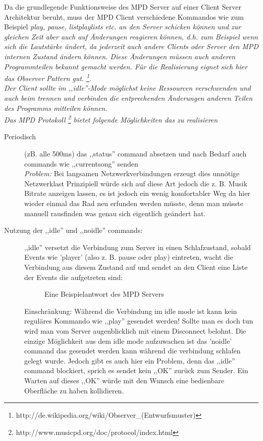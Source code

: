 Da die grundlegende Funktionsweise des MPD Server auf einer Client Server Architektur beruht, muss der MPD Client
verschiedene Kommandos wie zum Beispiel \it play, pause, listplaylists \rm etc. an den Server schicken können
und zur gleichen Zeit aber auch auf Änderungen reagieren können, d.h. zum Beispiel wenn sich die Lautstärke ändert,
da jederzeit auch andere Clients oder Server den MPD internen Zustand ändern können.
Diese Änderungen müssen auch anderen Programmteilen bekannt gemacht werden.
Für die Realisierung eignet sich hier das Observer Pattern gut. \footnote{http://de.wikipedia.org/wiki/Observer\_(Entwurfsmuster)}.
\\
Der Client sollte im ,,idle''-Mode möglichst keine Ressourcen verschwenden und auch beim 
trennen und verbinden die entprechenden Änderungen anderen Teilen des Programms mitteilen
können. 
\\

Das MPD Protokoll \footnote{http://www.musicpd.org/doc/protocol/index.html} bietet folgende Möglichkeiten das zu realisieren
\begin{description}
    \item [Periodisch] (zB. alle 500ms) das ,,status'' command absetzen und nach Bedarf auch commands wie ,,currentsong''
        senden
        \\
        \emph{Problem:} Bei langsamen Netzwerkverbindungen erzeugt dies unnötige Netzwerklast 
        Prinzipiell würde sich auf diese Art jedoch die z. B. Musik Bitrate anzeigen lassen, es ist jedoch ein
        wenig komfortabler Weg da hier wieder einmal das Rad neu erfunden werden müsste, denn man müsste manuell rausfinden 
        was genau sich eigentlich geändert hat.
    \item [Nutzung der ,,idle'' und ,,noidle'' commands:]
        ,,idle'' versetzt die Verbindung zum Server in einen Schlafzustand, sobald Events wie 'player' (also z. B. pause oder play) 
        eintreten, wacht die Verbindung aus diesem Zustand auf und sendet an den Client eine Liste der Events die aufgetreten sind:

	\begin{figure}[h!]
	  
	  \caption{Eine Beispielantwort des MPD Servers}
	  \label{dd_state}
	\end{figure}

        Einschränkung: Während die Verbindung im idle mode ist kann kein reguläres Kommando wie ,,play'' gesendet werden!
        Sollte man es doch tun wird man vom Server augenblicklich mit einem Disconnect belohnt.
        Die einzige Möglichkeit aus dem idle mode aufzuwachen ist das 'noidle' command das gesendet werden
        kann während die verbindung schlafen gelegt wurde.
        Jedoch gibt es auch hier ein Problem, denn das ,,idle'' command blockiert, sprich es sendet kein ,,OK'' zurück zum Sender.
        Ein Warten auf dieses ,,OK'' würde mit den Wunsch eine bedienbare Oberfläche zu haben kollidieren.
\end{description}


